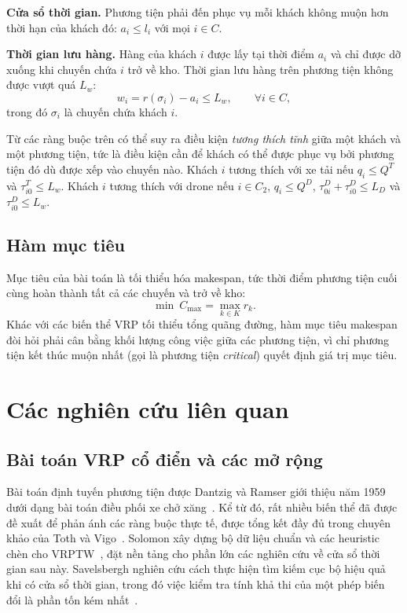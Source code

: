 \documentclass[../DoAn.tex]{subfiles}
\begin{document}
\textbf{Cửa sổ thời gian.} Phương tiện phải đến phục vụ mỗi khách không muộn hơn thời hạn của khách đó: $a_i \leq l_i$ với mọi $i \in C$.

\textbf{Thời gian lưu hàng.} Hàng của khách $i$ được lấy tại thời điểm $a_i$ và chỉ được dỡ xuống khi chuyến chứa $i$ trở về kho. Thời gian lưu hàng trên phương tiện không được vượt quá $L_w$:
\begin{equation}
w_i = r(\sigma_i) - a_i \leq L_w, \qquad \forall i \in C,
\label{eq:waiting}
\end{equation}
trong đó $\sigma_i$ là chuyến chứa khách $i$.

Từ các ràng buộc trên có thể suy ra điều kiện \textit{tương thích tĩnh} giữa một khách và một phương tiện, tức là điều kiện cần để khách có thể được phục vụ bởi phương tiện đó dù được xếp vào chuyến nào. Khách $i$ tương thích với xe tải nếu $q_i \leq Q^T$ và $\tau^T_{i0} \leq L_w$. Khách $i$ tương thích với drone nếu $i \in C_2$, $q_i \leq Q^D$, $\tau^D_{0i} + \tau^D_{i0} \leq L_D$ và $\tau^D_{i0} \leq L_w$.

\subsection{Hàm mục tiêu}

Mục tiêu của bài toán là tối thiểu hóa makespan, tức thời điểm phương tiện cuối cùng hoàn thành tất cả các chuyến và trở về kho:
\begin{equation}
\min\ C_{\max} = \max_{k \in K} r_k.
\label{eq:makespan}
\end{equation}
Khác với các biến thể VRP tối thiểu tổng quãng đường, hàm mục tiêu makespan đòi hỏi phải cân bằng khối lượng công việc giữa các phương tiện, vì chỉ phương tiện kết thúc muộn nhất (gọi là phương tiện \textit{critical}) quyết định giá trị mục tiêu.

\section{Các nghiên cứu liên quan}
\label{sec:relatedwork}

\subsection{Bài toán VRP cổ điển và các mở rộng}

Bài toán định tuyến phương tiện được Dantzig và Ramser giới thiệu năm 1959 dưới dạng bài toán điều phối xe chở xăng~\cite{dantzig1959truck}. Kể từ đó, rất nhiều biến thể đã được đề xuất để phản ánh các ràng buộc thực tế, được tổng kết đầy đủ trong chuyên khảo của Toth và Vigo~\cite{toth2014vehicle}. Solomon xây dựng bộ dữ liệu chuẩn và các heuristic chèn cho VRPTW~\cite{solomon1987algorithms}, đặt nền tảng cho phần lớn các nghiên cứu về cửa sổ thời gian sau này. Savelsbergh nghiên cứu cách thực hiện tìm kiếm cục bộ hiệu quả khi có cửa sổ thời gian, trong đó việc kiểm tra tính khả thi của một phép biến đổi là phần tốn kém nhất~\cite{savelsbergh1985local}.
\end{document}
